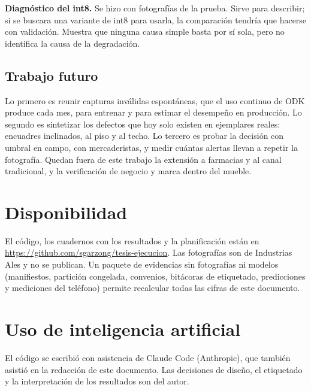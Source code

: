 \documentclass[conference]{IEEEtran}
\begin{document}
\textbf{Diagnóstico del int8.} Se hizo con fotografías de la prueba. Sirve para describir; si se buscara una
variante de int8 para usarla, la comparación tendría que hacerse con validación. Muestra que ninguna causa simple
basta por sí sola, pero no identifica la causa de la degradación.

\subsection{Trabajo futuro}

Lo primero es reunir capturas inválidas espontáneas, que el uso continuo de ODK produce cada
mes, para entrenar y para estimar el desempeño en producción. Lo segundo es sintetizar los defectos que hoy solo
existen en ejemplares reales: encuadres inclinados, al piso y al techo. Lo tercero es probar la decisión con umbral
en campo, con mercaderistas, y medir cuántas alertas llevan a repetir la fotografía. Quedan fuera de este trabajo
la extensión a farmacias y al canal tradicional, y la verificación de negocio y marca dentro del mueble.

\section*{Disponibilidad}

El código, los cuadernos con los resultados y la planificación están en
\url{https://github.com/sgarzong/tesis-ejecucion}. Las fotografías son de Industrias Ales y no se publican. Un
paquete de evidencias sin fotografías ni modelos (manifiestos, partición congelada, convenios, bitácoras de
etiquetado, predicciones y mediciones del teléfono) permite recalcular todas las cifras de este documento.

\section*{Uso de inteligencia artificial}

El código se escribió con asistencia de Claude Code (Anthropic), que también asistió en la redacción de este
documento. Las decisiones de diseño, el etiquetado y la interpretación de los resultados son del autor.
\end{document}
